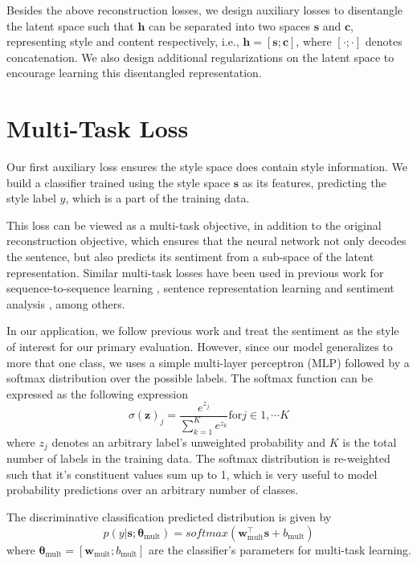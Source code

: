 Besides the above reconstruction losses, we design auxiliary losses to disentangle the latent space such that $\bm h$ can be separated into two spaces $\bm s$ and $\bm c$, representing style and content respectively, i.e., $\bm h = [\bm s ; \bm c]$, where $[\cdot;\cdot]$ denotes concatenation. We also design additional regularizations on the latent space to encourage learning this disentangled representation.


\section{Multi-Task Loss} \label{ssec:multitask-objective}

Our first auxiliary loss ensures the style space does contain style information. We build a classifier trained using the style space $\bm s$ as its features, predicting the style label $y$, which is a part of the training data.

This loss can be viewed as a multi-task objective, in addition to the original reconstruction objective, which ensures that the neural network not only decodes the sentence, but also predicts its sentiment from a sub-space of the latent representation. Similar multi-task losses have been used in previous work for sequence-to-sequence learning \citep{luong2015multi}, sentence representation learning \citep{jernite2017discourse} and sentiment analysis \citep{balikas2017multitask}, among others.

In our application, we follow previous work \citep{hu2017toward,shen2017style,fu2017style} and treat the sentiment as the style of interest for our primary evaluation. However, since our model generalizes to more that one class, we uses a simple multi-layer perceptron (MLP) followed by a softmax distribution over the possible labels. The softmax function can be expressed as the following expression
\begin{equation*}
	\sigma(\mathbf{z})_j = \frac{e^{z_j}}{\sum_{k=1}^K e^{z_k}} \text{for} j \in {1, \cdots K}
\end{equation*}
where $z_j$ denotes an arbitrary label's unweighted probability and $K$ is the total number of labels in the training data. The softmax distribution is re-weighted such that it's constituent values sum up to 1, which is very useful to model probability predictions over an arbitrary number of classes.

The discriminative classification predicted distribution is given by
\begin{equation} \label{eqn:class-pred}
	p(y | \bm s; \bm\theta_\text{mult}) = softmax(\bm w_\text{mult}^\top \bm s + b_\text{mult})
\end{equation}
where $\bm\theta_\text{mult}=[\bm w_\text{mult}; b_\text{mult}]$ are the classifier's parameters for multi-task learning.

